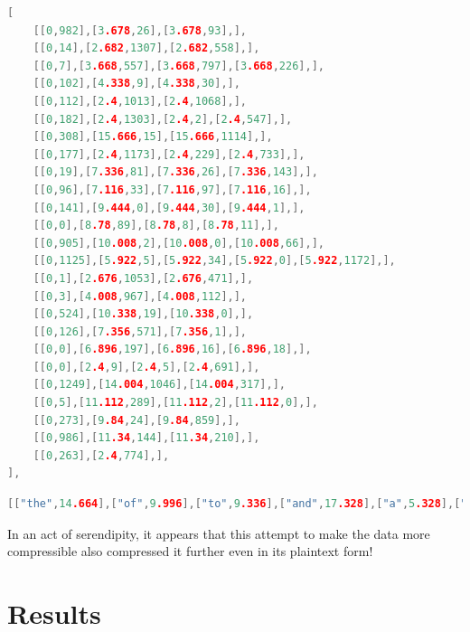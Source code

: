 \begin{lstlisting}[label=lst:deltasdata,captionpos=b,float,language=c,stringstyle=\color{blue},basicstyle=\ttfamily\footnotesize,caption={[Excerpt from JavaScript data file]Excerpt from a JavaScript data file that uses position deltas, representing one paragraph.}]
[
    [[0,982],[3.678,26],[3.678,93],],
    [[0,14],[2.682,1307],[2.682,558],],
    [[0,7],[3.668,557],[3.668,797],[3.668,226],],
    [[0,102],[4.338,9],[4.338,30],],
    [[0,112],[2.4,1013],[2.4,1068],],
    [[0,182],[2.4,1303],[2.4,2],[2.4,547],],
    [[0,308],[15.666,15],[15.666,1114],],
    [[0,177],[2.4,1173],[2.4,229],[2.4,733],],
    [[0,19],[7.336,81],[7.336,26],[7.336,143],],
    [[0,96],[7.116,33],[7.116,97],[7.116,16],],
    [[0,141],[9.444,0],[9.444,30],[9.444,1],],
    [[0,0],[8.78,89],[8.78,8],[8.78,11],],
    [[0,905],[10.008,2],[10.008,0],[10.008,66],],
    [[0,1125],[5.922,5],[5.922,34],[5.922,0],[5.922,1172],],
    [[0,1],[2.676,1053],[2.676,471],],
    [[0,3],[4.008,967],[4.008,112],],
    [[0,524],[10.338,19],[10.338,0],],
    [[0,126],[7.356,571],[7.356,1],],
    [[0,0],[6.896,197],[6.896,16],[6.896,18],],
    [[0,0],[2.4,9],[2.4,5],[2.4,691],],
    [[0,1249],[14.004,1046],[14.004,317],],
    [[0,5],[11.112,289],[11.112,2],[11.112,0],],
    [[0,273],[9.84,24],[9.84,859],],
    [[0,986],[11.34,144],[11.34,210],],
    [[0,263],[2.4,774],],
],
\end{lstlisting}

\begin{lstlisting}[label=lst:deltasdict,captionpos=b,float,language=c,stringstyle=\color{blue},basicstyle=\ttfamily\footnotesize,caption={[Excerpt from JavaScript data file]Excerpt from a JavaScript data file that uses position deltas, representing one paragraph.}]
[["the",14.664],["of",9.996],["to",9.336],["and",17.328],["a",5.328],["is",8.004],["be",11.328],["in",9.336],["as",9.996],["document",47.328],["that",18],["it",6.672],["page",22.656],["for",13.992],["are",14.652],["by",12],["on",12],["will",18.672],["which",29.328],["with",21.336],["this",17.34],["The",18.66],["can",16.656],["an",11.328],["or",9.996],["-",3.996],["eBook",31.332],["used",21.996],["PDF",22.008],
\end{lstlisting}

In an act of serendipity, it appears that this attempt to make the data more compressible also compressed it further even in its plaintext form!




\newpage
\section{Results}

